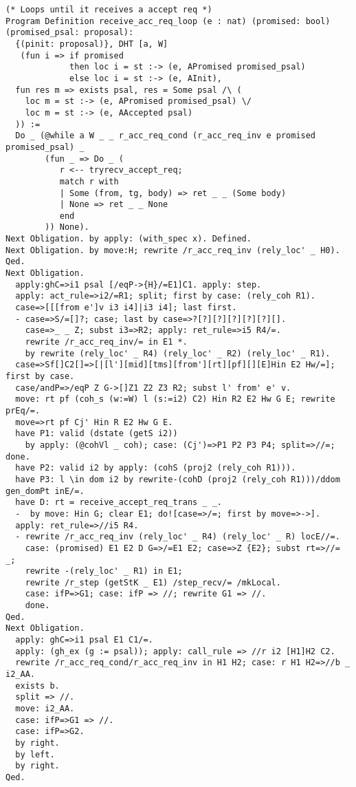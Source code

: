 \begin{landscape}
\begin{multicols*}{2}
\begin{lstlisting}[style=SourceCodeListing]
(* Loops until it receives a accept req *)
Program Definition receive_acc_req_loop (e : nat) (promised: bool) (promised_psal: proposal):
  {(pinit: proposal)}, DHT [a, W]
   (fun i => if promised
             then loc i = st :-> (e, APromised promised_psal)
             else loc i = st :-> (e, AInit),
  fun res m => exists psal, res = Some psal /\ (
    loc m = st :-> (e, APromised promised_psal) \/
    loc m = st :-> (e, AAccepted psal)
  )) :=
  Do _ (@while a W _ _ r_acc_req_cond (r_acc_req_inv e promised promised_psal) _
        (fun _ => Do _ (
           r <-- tryrecv_accept_req;
           match r with
           | Some (from, tg, body) => ret _ _ (Some body)
           | None => ret _ _ None
           end
        )) None).
Next Obligation. by apply: (with_spec x). Defined.
Next Obligation. by move:H; rewrite /r_acc_req_inv (rely_loc' _ H0). Qed.
Next Obligation.
  apply:ghC=>i1 psal [/eqP->{H}/=E1]C1. apply: step.
  apply: act_rule=>i2/=R1; split; first by case: (rely_coh R1).
  case=>[[[from e']v i3 i4]|i3 i4]; last first.
  - case=>S/=[]?; case; last by case=>?[?][?][?][?][?][].
    case=>_ _ Z; subst i3=>R2; apply: ret_rule=>i5 R4/=.
    rewrite /r_acc_req_inv/= in E1 *.
    by rewrite (rely_loc' _ R4) (rely_loc' _ R2) (rely_loc' _ R1).
  case=>Sf[]C2[]=>[|[l'][mid][tms][from'][rt][pf][][E]Hin E2 Hw/=]; first by case.
  case/andP=>/eqP Z G->[]Z1 Z2 Z3 R2; subst l' from' e' v.
  move: rt pf (coh_s (w:=W) l (s:=i2) C2) Hin R2 E2 Hw G E; rewrite prEq/=.
  move=>rt pf Cj' Hin R E2 Hw G E.
  have P1: valid (dstate (getS i2))
    by apply: (@cohVl _ coh); case: (Cj')=>P1 P2 P3 P4; split=>//=; done.
  have P2: valid i2 by apply: (cohS (proj2 (rely_coh R1))).
  have P3: l \in dom i2 by rewrite-(cohD (proj2 (rely_coh R1)))/ddom gen_domPt inE/=.
  have D: rt = receive_accept_req_trans _ _.
  -  by move: Hin G; clear E1; do![case=>/=; first by move=>->].
  apply: ret_rule=>//i5 R4.
  - rewrite /r_acc_req_inv (rely_loc' _ R4) (rely_loc' _ R) locE//=.
    case: (promised) E1 E2 D G=>/=E1 E2; case=>Z {E2}; subst rt=>//= _;
    rewrite -(rely_loc' _ R1) in E1;
    rewrite /r_step (getStK _ E1) /step_recv/= /mkLocal.
    case: ifP=>G1; case: ifP => //; rewrite G1 => //.
    done.
Qed.
Next Obligation.
  apply: ghC=>i1 psal E1 C1/=.
  apply: (gh_ex (g := psal)); apply: call_rule => //r i2 [H1]H2 C2.
  rewrite /r_acc_req_cond/r_acc_req_inv in H1 H2; case: r H1 H2=>//b _ i2_AA.
  exists b.
  split => //.
  move: i2_AA.
  case: ifP=>G1 => //.
  case: ifP=>G2.
  by right.
  by left.
  by right.
Qed.


\end{lstlisting}
\end{multicols*}
\end{landscape}

